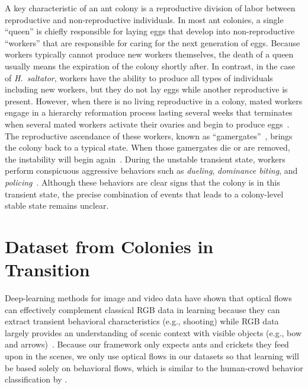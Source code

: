 \documentclass[letterpaper]{article} %
\begin{document}
A key characteristic of an ant colony is a reproductive division of
labor between reproductive and non-reproductive individuals.
In most ant colonies, a single ``queen'' is chiefly responsible for
laying eggs that develop into non-reproductive ``workers'' that
are responsible for caring for the next generation of eggs.
Because workers typically cannot produce
new workers themselves, the death of a queen usually means the
expiration of the colony shortly after.
In contrast, in the case of \emph{H.~saltator}, workers
have the ability to produce all types of individuals including new
workers,
but they do not lay eggs while another
reproductive is present. However, when there is no living reproductive
in a colony, mated workers engage in a hierarchy reformation process
lasting several weeks that terminates when several mated workers activate
their ovaries and begin to produce eggs~\citep{LPH99, SPSHPL16}. The
reproductive ascendance of these workers, known as
``gamergates''~\citep{PC85}, brings the colony back to a typical state.
When those gamergates die or are removed, the instability will begin
again~\citep{LPH99, SPSHPL16}.
During the unstable transient state, workers perform conspicuous aggressive
behaviors such as \emph{dueling}, \emph{dominance biting}, and
\emph{policing}~\citep{SPSHPL16}.
Although these behaviors are clear signs that the colony is in
this transient state, the precise combination of events that
leads to a colony-level stable state remains unclear.



\section{Dataset from Colonies in Transition}
\label{sec:dataset}

Deep-learning methods for image and video data have shown that optical
flows can effectively complement classical RGB data in learning because
they can extract transient behavioral characteristics (e.g., shooting)
while RGB data largely provides an understanding of scenic context with
visible objects (e.g., bow and arrows)~\citep{SZ14}. Because our
framework only expects ants and crickets they feed upon in
the scenes, we only use optical flows in our datasets so that learning
will be based solely on behavioral flows, which is similar to
the human-crowd behavior classification by \citet{MOS09}.
\end{document}
